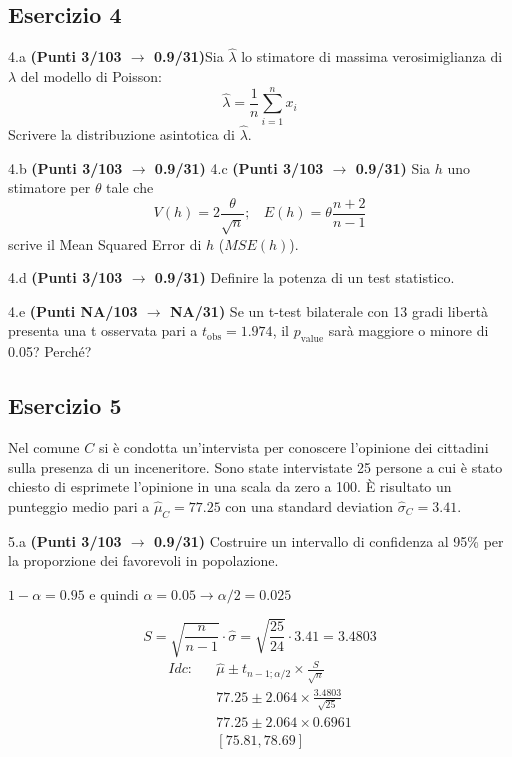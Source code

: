 \documentclass[
  11pt,
]{book}
\theoremstyle{mytheoremstyle}
\theoremstyle{mydefstyle}
\newenvironment{sol}
  {
  \begin{tcolorbox}[enhanced,breakable,arc=0.1mm,boxrule=1pt,colback=white,colframe=iblue,
  title=\bf \fontfamily{lmss}\selectfont \hspace{.5 cm} Soluzione,drop fuzzy shadow]

}{
\end{tcolorbox}
  }
\begin{document}
\subsection{Esercizio 4}\label{esercizio-4-29}

4.a \textbf{(Punti 3/103 \(\rightarrow\) 0.9/31)}Sia \(\hat \lambda\) lo stimatore di massima verosimiglianza di \(\lambda\) del modello di Poisson:
\[\hat\lambda =  \frac 1n\sum_{i=1}^nx_i\]
Scrivere la distribuzione asintotica di \(\hat \lambda\).

4.b \textbf{(Punti 3/103 \(\rightarrow\) 0.9/31)} 4.c \textbf{(Punti 3/103 \(\rightarrow\) 0.9/31)} Sia \(h\) uno stimatore per \(\theta\) tale che
\[V(h)=2\frac\theta {\sqrt{n}};~~~~E(h)=\theta\frac{n+2}{n-1}\]
scrive il Mean Squared Error di \(h\) (\(MSE(h)\)).

4.d \textbf{(Punti 3/103 \(\rightarrow\) 0.9/31)} Definire la potenza di un test statistico.

4.e \textbf{(Punti NA/103 \(\rightarrow\) NA/31)} Se un t-test bilaterale con 13 gradi libertà presenta una
t osservata pari a \(t_\text{obs}=1.974\), il \(p_\text{value}\) sarà maggiore o minore di 0.05? Perché?

\subsection{Esercizio 5}\label{esercizio-5-28}

Nel comune \(C\) si è condotta un'intervista per conoscere l'opinione
dei cittadini sulla presenza di un inceneritore. Sono state intervistate
25 persone a cui è stato chiesto di esprimete l'opinione in una scala da zero a 100.
È risultato un punteggio medio pari a \(\hat\mu_C=77.25\) con una standard deviation
\(\hat\sigma_C=3.41\).

5.a \textbf{(Punti 3/103 \(\rightarrow\) 0.9/31)} Costruire un intervallo di confidenza al 95\%
per la proporzione dei favorevoli in popolazione.

\begin{sol}
\(1-\alpha =0.95\) e quindi \(\alpha=0.05\rightarrow \alpha/2=0.025\)

\[
      S  =\sqrt{\frac {n}{n-1}}\cdot\hat\sigma =
     \sqrt{\frac { 25 }{ 24 }}\cdot 3.41 = 3.4803 
\]
\begin{eqnarray*}
  Idc: & &  \hat\mu \pm  t_{n-1;\alpha/2} \times \frac{S}{\sqrt{n}} \\
     & &  77.25 \pm  2.064 \times \frac{ 3.4803 }{\sqrt{ 25 }} \\
     & &  77.25 \pm  2.064 \times  0.6961 \\
     & & [ 75.81 ,  78.69 ]
\end{eqnarray*}

\end{sol}
\end{document}
